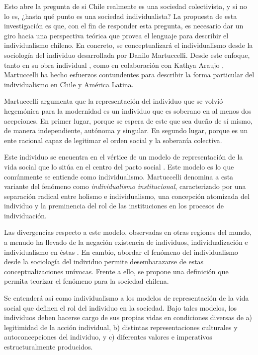 \documentclass[12pt,oneside]{templates/facsothesis}
\begin{document}
Esto abre la pregunta de si Chile realmente es una sociedad colectivista, y si no lo es, ¿hasta qué punto es una sociedad individualista? La propuesta de esta investigación es que, con el fin de responder esta pregunta, es necesario dar un giro hacia una perspectiva teórica que provea el lenguaje para describir el individualismo chileno. En concreto, se conceptualizará el individualismo desde la sociología del individuo desarrollada por Danilo Martuccelli. Desde este enfoque, tanto en su obra individual \citep{martuccelli2010, martuccelli2018}, como en colaboración con Kathya Araujo \citep{araujo2014, araujo2020, araujo2012}, Martuccelli ha hecho esfuerzos contundentes para describir la forma particular del individualismo en Chile y América Latina.

Martuccelli \citeyearpar{martuccelli2010} argumenta que la representación del individuo que se volvió hegemónica para la modernidad es un individuo que es soberano en al menos dos acepciones. En primer lugar, porque se espera de este que sea dueño de sí mismo, de manera independiente, autónoma y singular. En segundo lugar, porque es un ente racional capaz de legitimar el orden social y la soberanía colectiva.

Este individuo se encuentra en el vértice de un modelo de representación de la vida social que lo sitúa en el centro del pacto social \citep{martuccelli2010, martuccelli2018}. Este modelo es lo que comúnmente se entiende como individualismo. Martuccelli \citeyearpar{martuccelli2018} denomina a esta variante del fenómeno como \emph{individualismo institucional}, caracterizado por una separación radical entre holismo e individualismo, una concepción atomizada del individuo y la preminencia del rol de las instituciones en los procesos de individuación.

Las divergencias respecto a este modelo, observadas en otras regiones del mundo, a menudo ha llevado de la negación existencia de individuos, individualización e individualismo en éstas \citep{martuccelli2010}. En cambio, abordar el fenómeno del individualismo desde la sociología del individuo permite desembarazarse de estas conceptualizaciones unívocas. Frente a ello, se propone una definición que permita teorizar el fenómeno para la sociedad chilena.

Se entenderá así como individualismo a los modelos de representación de la vida social que definen el rol del individuo en la sociedad. Bajo tales modelos, los individuos deben hacerse cargo de sus propias vidas en condiciones diversas de a) legitimidad de la acción individual, b) distintas representaciones culturales y autoconcepciones del individuo, y c) diferentes valores e imperativos estructuralmente producidos.
\end{document}
